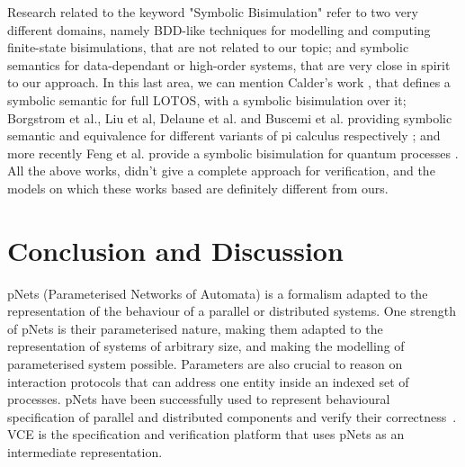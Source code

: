 \documentclass{lmcs}
\begin{document}

Research related to the keyword "Symbolic Bisimulation" refer to two very different domains, namely BDD-like techniques for modelling and computing finite-state bisimulations, that are not related to our topic; and symbolic semantics for data-dependant or high-order systems, that are very close in spirit to our approach. In this last area, we can mention
Calder's work \cite{calder2001symbolic}, that  defines a symbolic semantic for full LOTOS, with a symbolic bisimulation over it;
Borgstrom et al., Liu et al, Delaune et al. and Buscemi et al. providing symbolic semantic and equivalence for different variants of pi calculus respectively \cite{borgstrom2004symbolic,delaune2007symbolic,liu2010complete,buscemi2008open}; and more recently
 Feng et al. provide a symbolic bisimulation for quantum processes \cite{feng2014symbolic}.
All the above works, didn't give a complete approach for verification, and the models on which these works based are definitely different from ours.



\section{Conclusion and Discussion}
\label{section:conclusion}
 pNets (Parameterised Networks of Automata) is a formalism adapted to the representation of the behaviour of a parallel or distributed systems. One  strength of pNets is their parameterised nature, making them adapted to the representation of systems of arbitrary size, and making the modelling of parameterised system possible. Parameters are also crucial to reason on interaction protocols that can address one entity inside an indexed set of processes. pNets have been successfully used to represent behavioural specification of parallel and distributed components and verify their correctness~\cite{AmeurBoulifa2017,HKM-FASE16}. VCE is the specification and verification platform that uses pNets as an intermediate representation.
\end{document}
